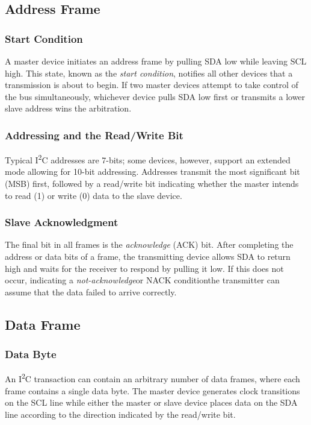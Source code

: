 \documentclass[openany,11pt,fleqn]{book} %
\begin{document}
    \subsection{Address Frame}
        \subsubsection{Start Condition}
        A master device initiates an address frame by pulling SDA low while leaving SCL high. This state, known as the \textit{start condition}, notifies all other devices that a transmission is about to begin. If two master devices attempt to take control of the bus simultaneously, whichever device pulls SDA low first or transmits a lower slave address wins the arbitration. 
        \subsubsection{Addressing and the Read/Write Bit}
        Typical I\textsuperscript{2}C addresses are 7-bits; some devices, however, support an extended mode allowing for 10-bit addressing. Addresses transmit the most significant bit (MSB) first, followed by a read/write bit indicating whether the master intends to read (1) or write (0) data to the slave device. 
        \subsubsection{Slave Acknowledgment}
        The final bit in all frames is the \textit{acknowledge} (ACK) bit. After completing the address or data bits of a frame, the transmitting device allows SDA to return high and waits for the receiver to respond by pulling it low. If this does not occur, indicating a \textit{not-acknowledge}\textemdash or NACK condition\textemdash the transmitter can assume that the data failed to arrive correctly. 
    \subsection{Data Frame}
        \subsubsection{Data Byte}
        An I\textsuperscript{2}C transaction can contain an arbitrary number of data frames, where each frame contains a single data byte. The master device generates clock transitions on the SCL line while either the master or slave device places data on the SDA line according to the direction indicated by the read/write bit. 
\end{document}
